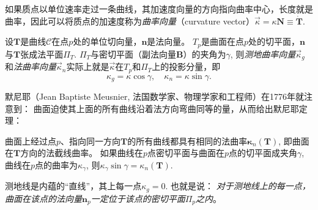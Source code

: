 \documentclass{article}
\begin{document}
如果质点以单位速率走过一条曲线，其加速度向量的方向指向曲率中心，长度就是曲率，因此可以将质点的加速度称为\emph{曲率向量}（curvature vector）$\overrightarrow{\kappa}=\kappa\mathbf{N}\equiv\dot{\mathbf{T}}$.

设$\mathbf{T}$是曲线$\mathcal{C}$在点$p$处的单位切向量，$\mathbf{n}$是法向量。
$T_{p}$是曲面在点$p$处的切平面，$\mathbf{n}$与$\mathbf{T}$张成法平面$\Pi_{T}$.
$\Pi_{T}$与密切平面（副法向量$\mathbf{B}$）的夹角为$\gamma$, 则\emph{测地曲率向量}$\overrightarrow{\kappa}_{g}$和\emph{法曲率向量}$\overrightarrow{\kappa}_{n}$实际上就是$\overrightarrow{\kappa}$在$T_{p}$和$\Pi_{T}$上的投影分量，即
\begin{equation}
    \kappa_{g}=\kappa\cos\gamma, \quad
    \kappa_{n}=\kappa\sin\gamma.
\end{equation}

默尼耶（Jean Baptiste Meusnier, 法国数学家、物理学家和工程师）在1776年就注意到：
曲面迫使其上面的所有曲线沿着法方向弯曲同等的量，从而给出默尼耶定理：
\begin{tcolorbox}[colback=white, arc=3mm, auto outer arc]
\begin{minipage}[c,t]{1.0\textwidth}
\kaishu
曲面上经过点$p$、指向同一方向$\mathbf{T}$的所有曲线都具有相同的法曲率$\mathbf{\kappa}_{n}(\mathbf{T})$, 即曲面在$\mathbf{T}$方向的法截线曲率。
如果曲线在$p$点密切平面与曲面在$p$点的切平面成夹角$\gamma$, 曲线在$p$点的曲率为$\kappa_{\gamma}$, 
则$\kappa_{\gamma}\sin\gamma=\kappa_{n}(\mathbf{T})$.
\end{minipage}
\end{tcolorbox}

测地线是内蕴的“直线”，其上每一点$\kappa_{g}=0$.
也就是说：
\emph{对于测地线上的每一点，曲面在该点的法向量$\mathbf{n}_{p}$一定位于该点的密切平面$\Pi_{p}$之内}。

%
%
\end{document}
